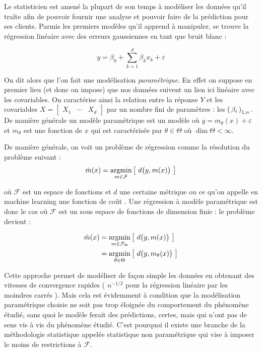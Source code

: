 Le statisticien est amené la plupart de son temps à modéliser les données qu'il traîte afin de pouvoir fournir une analyse et pouvoir faire de la prédiction pour ses clients. Parmis les premiers modèles qu'il apprend à manipuler, se trouve la régression linéaire avec des erreurs gaussiennes en tant que bruit blanc :

\begin{equation*}
    y = \beta_0 + \sum_{k=1}^d \beta_k x_k + \varepsilon
\end{equation*}

On dit alors que l'on fait une modélisation \emph{paramétrique}. En effet on suppose en premier lieu (et donc on impose) que nos données suivent un lien ici linéaire avec les covariables. On caractérise ainsi la relation entre la réponse $Y$ et les covariables $X = \begin{bmatrix} X_1 & \cdots & X_d \end{bmatrix}$ par un nombre fini de paramètres : les $\left( \, {\beta} _ {i} \, \right)_{1, n}$. De manière générale un modèle paramétrique est un modèle où $y = m_\theta(x) + \varepsilon$ et $m_\theta$ est une fonction de $x$ qui est caractérisée par $\theta \in \Theta$ où $\dim \Theta < \infty$.

De manière générale, on voit un problème de régression comme la résolution du problème suivant :
\begin{equation}
    \hat m(x) = \argmin\limits_{m \in \mathcal F}\left[ \ d\bigl(y, m(x)\bigr) \ \right]
\end{equation}

où $\mathcal F$ est un espace de fonctions et $d$ une certaine métrique ou ce qu'on appelle en machine learning \og une fonction de coût \fg. Une régression à modèle paramétrique est donc le cas où $\mathcal F$ est un sous espace de fonctions de dimension finie : le problème devient :

\begin{align}
    \hat m(x) & = \argmin\limits_{m \in \mathcal F_\Theta}\left[ \ d\bigl(y, m(x)\bigr) \ \right]
    \notag \\
    & =  \argmin\limits_{\theta \in \Theta}\left[ \ d\bigl(y, m_\theta(x)\bigr) \ \right]
\end{align}

Cette approche permet de modéliser de façon simple les données en obtenant des vitesses de convergence rapides ( $n^{- 1 / 2}$ pour la régression linéaire par les moindres carrés ). Mais cela est évidemment à condition que la modélisation paramétrique choisie ne soit pas trop éloignée du comportement du phénomène étudié, sans quoi le modèle ferait des prédictions, certes, mais qui n'ont pas de sens vis à vis du phénomène étudié. C'est pourquoi il existe une branche de la méthodologie statistique appelée \og statistique non paramétrique \fg qui vise à imposer le moins de restrictions à $\mathcal F$.

